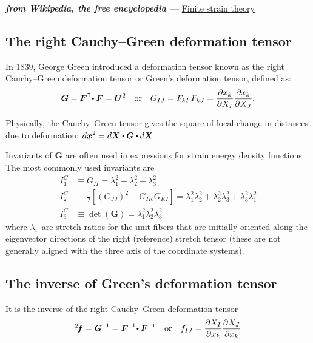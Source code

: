 \begin{otherlanguage}{russian}
{\small%
\setlength{\abovedisplayskip}{2pt}\setlength{\belowdisplayskip}{2pt}

\noindent \textbf{\emph{from Wikipedia, the free encyclopedia}}~--- \href{https://en.wikipedia.org/wiki/Finite_strain_theory}{Finite strain theory}

\subsection*{The right Cauchy\hbox{--}Green deformation tensor}

In 1839, George Green introduced a deformation tensor known as the right Cauchy\hbox{--}Green deformation tensor or Green’s deformation tensor, defined as:
\[ \displaystyle \bm{G} = \bm{F}^{\hspace{.1ex}\T} \!\dotp \bm{F} = \bm{U}^{2}
\quad {\text{or}} \quad
G_{IJ} = F_{kI}\,F_{kJ} = {\frac{\partial x_{k}}{\partial X_{I}}}{\frac{\partial x_{k}}{\partial X_{J}}}. \]

Physically, the Cauchy\hbox{--}Green tensor gives the square of local change in distances due to deformation: ${\displaystyle d\bm{x} ^{2}=d\bm{X} \dotp \bm{G} \dotp d\bm{X} \,\!}$

Invariants of ${\bm{G}}$ are often used in expressions for strain energy density functions. The most commonly used invariants are
\[{\displaystyle {\begin{aligned}I_{1}^{G} & \equiv G_{II}=\lambda_{1}^{2}+\lambda_{2}^{2}+\lambda_{3}^{2}\\
I_{2}^{G} & \equiv {\tfrac {1}{2}}\left[(G_{JJ})^{2} - G_{IK} G_{KI}\right] = \lambda_{1}^{2}\lambda_{2}^{2}+\lambda_{2}^{2}\lambda_{3}^{2}+\lambda_{3}^{2}\lambda_{1}^{2}\\
I_{3}^{G} & \equiv \det(\bm{G} )=\lambda_{1}^{2}\lambda_{2}^{2}\lambda_{3}^{2}\end{aligned}}}\]
where $\lambda_{i}\,\!$ are stretch ratios for the unit fibers that are initially oriented along the eigenvector directions of the right (reference) stretch tensor (these are not generally aligned with the three axis of the coordinate systems).

\subsection*{The inverse of Green’s deformation tensor}

It is the inverse of the right Cauchy\hbox{--}Green deformation tensor
\[ \displaystyle ^2\hspace{-0.4ex}\bm{f} = \bm{G}^{\expminusone} = \bm{F}^{\expminusone} \! \dotp \bm{F}^{\expminusT}
\quad {\text{or}} \quad
f_{IJ}={\frac{\partial X_{I}}{\partial x_{k}}}{\frac{\partial X_{J}}{\partial x_{k}}} \]

}
\end{otherlanguage}

